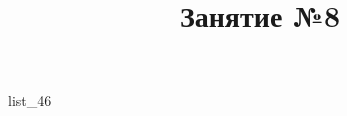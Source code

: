 \documentclass[12pt, a4paper]{article}
\begin{document}
	\title{Занятие №8}
	{list_46}
\end{document}
